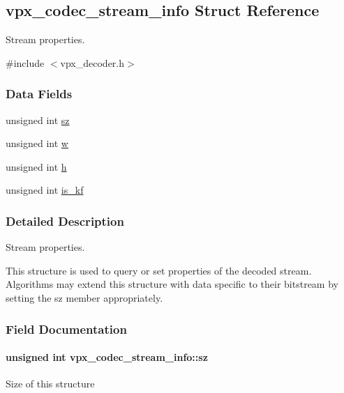 \hypertarget{structvpx__codec__stream__info}{}\subsection{vpx\+\_\+codec\+\_\+stream\+\_\+info Struct Reference}
\label{structvpx__codec__stream__info}


Stream properties.  




{\ttfamily \#include $<$vpx\+\_\+decoder.\+h$>$}

\subsubsection*{Data Fields}
\begin{DoxyCompactItemize}
\item 
unsigned int \hyperlink{structvpx__codec__stream__info_a8e5eb38a9042da54a20607f71591ddbf}{sz}
\item 
unsigned int \hyperlink{structvpx__codec__stream__info_a957dbfa83c93d9b3dc08498a6b97c77d}{w}
\item 
unsigned int \hyperlink{structvpx__codec__stream__info_af7a8b114547e434d182c722bdace63a0}{h}
\item 
unsigned int \hyperlink{structvpx__codec__stream__info_a8c9060997f16d43219462554c882dbd3}{is\+\_\+kf}
\end{DoxyCompactItemize}


\subsubsection{Detailed Description}
Stream properties. 

This structure is used to query or set properties of the decoded stream. Algorithms may extend this structure with data specific to their bitstream by setting the sz member appropriately. 

\subsubsection{Field Documentation}
\paragraph[{\texorpdfstring{sz}{sz}}]{\setlength{\rightskip}{0pt plus 5cm}unsigned int vpx\+\_\+codec\+\_\+stream\+\_\+info\+::sz}\hypertarget{structvpx__codec__stream__info_a8e5eb38a9042da54a20607f71591ddbf}{}\label{structvpx__codec__stream__info_a8e5eb38a9042da54a20607f71591ddbf}
Size of this structure 

